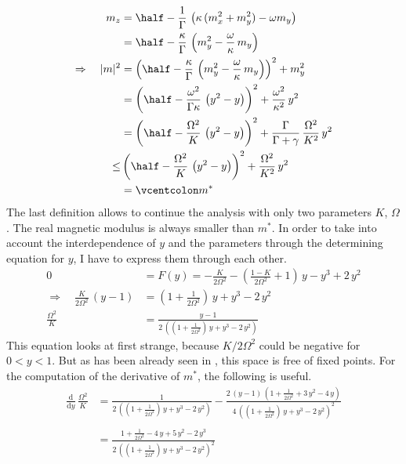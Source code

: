 \begin{appendices}
    \begin{align*}
        m_z&=\half-\frac{1}{\Gamma}\,\left( \kappa\,(m_x^2+m_y^2)-\omega m_y  \right)\\
        &=\half-\frac{\kappa}{\Gamma}\,\left( m_y^2-\frac{\omega}{\kappa}\, m_y  \right)\\
        \Rightarrow\quad |m|^2&=\left( \half-\frac{\kappa}{\Gamma}\,\left( m_y^2-\frac{\omega}{\kappa}\, m_y  \right) \right)^2+m_y^2\\
        &=\left( \half-\frac{\omega^2}{\Gamma\kappa}\,\left( {y}^2- {y} \right) \right)^2+\frac{\omega^2}{\kappa^2}\,{y}^2\\
        &=\left( \half-\frac{\Omega^2}{K}\,\left( {y}^2- {y} \right) \right)^2+\frac{\Gamma}{\Gamma+\gamma}\,\frac{\Omega^2}{K^2}\,{y}^2\\
        \leq&\left( \half-\frac{\Omega^2}{K}\,\left( {y}^2- {y} \right) \right)^2+\frac{\Omega^2}{K^2}\,{y}^2\\
        &=\vcentcolon m^*
    \end{align*}
    The last definition allows to continue the analysis with only two parameters $K$, $\Omega$. The real magnetic modulus is always smaller than $m^*$. In order to take into account the interdependence of $y$ and the parameters through the determining equation for $y$, I have to express them through each other. 
    \begin{align*}
        0&=F(y)=-\frac{K}{2\Omega^2}-\left( \frac{1-K}{2\Omega^2} +1\right)\,{y}-{y}^3+2\,{y}^2\\
        \Rightarrow\quad \frac{K}{2\Omega^2}\,({y}-1)&=(1+\frac{1}{2\Omega^2})\,{y}+{y}^3-2\,{y}^2\\
        \frac{\Omega^2}{K}&=\frac{{y}-1}{2\,\left(  (1+\frac{1}{2\Omega^2})\,{y}+{y}^3-2\,{y}^2\right)}
    \end{align*}
    This equation looks at first strange, because $K/2\Omega^2$ could be negative for $0<{y}<1$. But as has been already seen in , this space is free of fixed points. For the computation of the derivative of $m^*$, the following is useful. 
    \begin{align*}
        \frac{\text{d}}{\text{d}{y}}\,\frac{\Omega^2}{K}&=\frac{1}{2\,\left(  (1+\frac{1}{2\Omega^2})\,{y}+{y}^3-2\,{y}^2\right)}-\frac{2\,({y}-1)\,(1+\frac{1}{2\Omega^2}+3\,{y}^2-4\,{y})}{4\,\left(  (1+\frac{1}{2\Omega^2})\,{y}+{y}^3-2\,{y}^2\right)^2}\\\\
        &=\frac{1+\frac{1}{2\Omega^2}-4\,{y}+5\,{y}^2-2\,{y}^3}{2\,\left(  (1+\frac{1}{2\Omega^2})\,{y}+{y}^3-2\,{y}^2\right)^2}

\end{align*}
\end{appendices}
